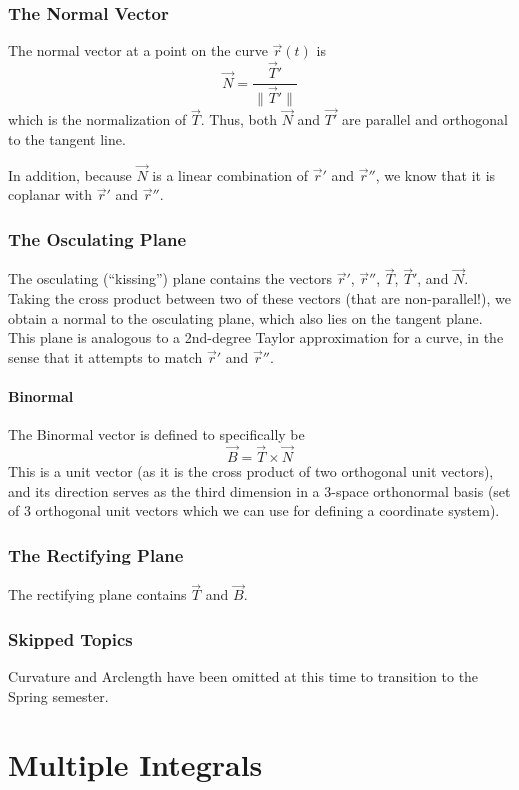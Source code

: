 \documentclass{article}
\newcommand{\vect}[1]{\ensuremath{\overrightarrow{#1}}}
\newcommand{\magnitude}[1]{\ensuremath{\lVert #1 \rVert}}
\begin{document}
\subsubsection{The Normal Vector}
The normal vector at a point on the curve $\vect{r}(t)$ is $$\vect{N}=\frac{\vect{T}'}{\magnitude{\vect{T}'}}$$ which is the normalization of $\vect{T}$.
Thus, both $\vect{N}$ and $\vect{T'}$ are parallel and orthogonal to the tangent line.

In addition, because $\vect{N}$ is a linear combination of $\vect{r}'$ and $\vect{r}''$, we know that it is coplanar with $\vect{r}'$ and $\vect{r}''$.

\subsubsection{The Osculating Plane}
The osculating (``kissing'') plane contains the vectors $\vect{r}'$, $\vect{r}''$, $\vect{T}$, $\vect{T}'$, and $\vect{N}$. Taking the cross product between two of these vectors (that are non-parallel!), we obtain a normal to the osculating plane, which also lies on the tangent plane. This plane is analogous to a 2nd-degree Taylor approximation for a curve, in the sense that it attempts to match $\vect{r}'$ and $\vect{r}''$.

\paragraph{Binormal} The Binormal vector is defined to specifically be
$$\vect{B}=\vect{T}\times\vect{N}$$
This is a unit vector (as it is the cross product of two orthogonal unit vectors), and its direction serves as the third dimension in a 3-space orthonormal basis (set of 3 orthogonal unit vectors which we can use for defining a coordinate system).

\subsubsection{The Rectifying Plane}
The rectifying plane contains $\vect{T}$ and $\vect{B}$.

\subsubsection{Skipped Topics}
Curvature and Arclength have been omitted at this time to transition to the Spring semester.

\section{Multiple Integrals}
\end{document}
